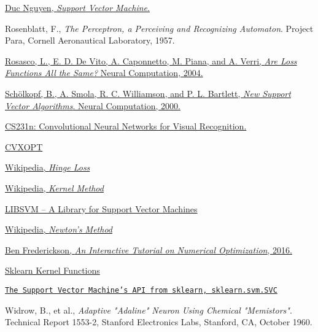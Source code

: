 \begin{thebibliography}{99}
    \href{https://dukn.github.io/MLDL/basicmachinelearning/2017/05/04/SVM/}{Duc Nguyen, \textit{Support Vector Machine}.}

    {Rosenblatt, F., \textit{The Perceptron, a Perceiving and Recognizing Automaton}. Project Para, Cornell Aeronautical Laboratory, 1957.}

    \href{http://web.mit.edu/lrosasco/www/publications/loss.pdf}{Rosasco, L., E. D. De Vito, A. Caponnetto, M. Piana, and A. Verri, \textit{Are Loss Functions All the Same?} Neural Computation, 2004.}

    \href{http://citeseerx.ist.psu.edu/viewdoc/download?doi=10.1.1.94.2928&rep=rep1&type=pdf}{Schölkopf, B., A. Smola, R. C. Williamson, and P. L. Bartlett, \textit{New Support Vector Algorithms}. Neural Computation, 2000.}

    \href{http://cs231n.github.io/linear-classify/}{CS231n: Convolutional Neural Networks for Visual Recognition.}

    \href{http://cvxopt.org/}{CVXOPT}

    \href{https://en.wikipedia.org/wiki/Hinge_loss}{Wikipedia, \textit{Hinge Loss}}

    \href{https://en.wikipedia.org/wiki/Kernel_method}{Wikipedia, \textit{Kernel Method}}

    \href{https://www.csie.ntu.edu.tw/~cjlin/libsvm/}{LIBSVM – A Library for Support Vector Machines}

    \href{https://en.wikipedia.org/wiki/Newton's_method}{Wikipedia, \textit{Newton's Method}}

    \href{http://www.benfrederickson.com/numerical-optimization/}{Ben Frederickson, \textit{An Interactive Tutorial on Numerical Optimization}, 2016.}

    \href{http://scikit-learn.org/stable/modules/svm.html#svm-kernels}{Sklearn Kernel Functions}

    \href{http://scikit-learn.org/stable/modules/generated/sklearn.svm.SVC.html}{\texttt{The Support Vector Machine's API from sklearn, sklearn.svm.SVC}}

    {Widrow, B., et al., \textit{Adaptive "Adaline" Neuron Using Chemical "Memistors"}. Technical Report 1553-2, Stanford Electronics Labs, Stanford, CA, October 1960.}


\end{thebibliography}
